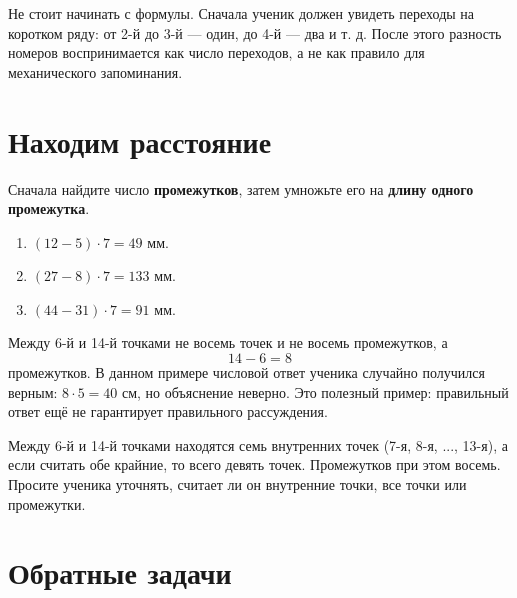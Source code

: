 \begin{teacherbox}
  Не стоит начинать с формулы. Сначала ученик должен увидеть переходы на
  коротком ряду: от 2-й до 3-й --- один, до 4-й --- два и т. д. После этого
  разность номеров воспринимается как число переходов, а не как правило для
  механического запоминания.
\end{teacherbox}

\section{Находим расстояние}

\begin{propertybox}
  Сначала найдите число \textbf{промежутков}, затем умножьте его на
  \textbf{длину одного промежутка}.
\end{propertybox}

\begin{practicebox}
  \begin{enumerate}[label=\alph*),itemsep=0.5em]
    \item \((12-5)\cdot7=49\) мм.
    \item \((27-8)\cdot7=133\) мм.
    \item \((44-31)\cdot7=91\) мм.
  \end{enumerate}
\end{practicebox}

\clearpage
\begin{thinkbox}
  Между 6-й и 14-й точками не восемь точек и не восемь промежутков, а
  \[
    14-6=8
  \]
  промежутков. В данном примере числовой ответ ученика случайно получился
  верным: \(8\cdot5=40\) см, но объяснение неверно. Это полезный пример:
  правильный ответ ещё не гарантирует правильного рассуждения.
\end{thinkbox}

\begin{teacherbox}
  Между 6-й и 14-й точками находятся семь внутренних точек
  (7-я, 8-я, ..., 13-я), а если считать обе крайние, то всего девять точек.
  Промежутков при этом восемь. Просите ученика уточнять, считает ли он
  внутренние точки, все точки или промежутки.
\end{teacherbox}

\section{Обратные задачи}

